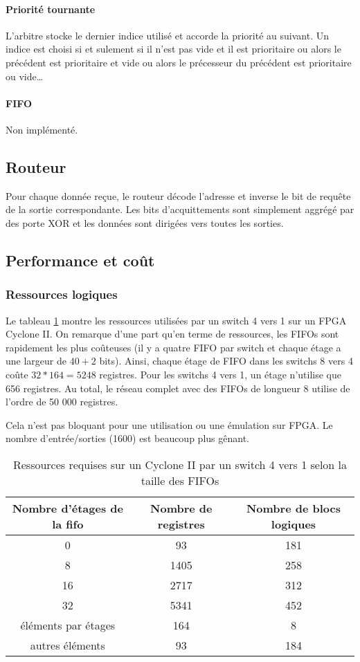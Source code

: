 \documentclass[11pt]{article}
\begin{document}
\paragraph{Priorité tournante}
L'arbitre stocke le dernier indice utilisé et accorde la priorité au suivant. Un indice est choisi si et sulement si il n'est pas vide et il est prioritaire ou alors le précédent est prioritaire et vide ou alors le précesseur du précédent est prioritaire ou vide\ldots
\paragraph{FIFO} Non implémenté.


\subsection{Routeur}

Pour chaque donnée reçue, le routeur décode l'adresse et inverse le bit de requête de la sortie correspondante. Les bits d'acquittements sont simplement aggrégé par des porte XOR et les données sont dirigées vers toutes les sorties.

\subsection{Performance et coût}

\subsubsection{Ressources logiques}
Le tableau \ref{perfs-sw-4} montre les ressources utilisées par un switch 4 vers 1 sur un FPGA Cyclone II. On remarque d'une part qu'en terme de ressources, les FIFOs sont rapidement les plus coûteuses (il y a quatre FIFO par switch et chaque étage a une largeur de $40+2$ bits). Ainsi, chaque étage de FIFO dans les switchs 8 vers 4 coûte $32*164=5248$ registres. Pour les switchs 4 vers 1, un étage n'utilise que 656 registres. Au total, le réseau complet avec des FIFOs de longueur 8 utilise de l'ordre de 50 000 registres.

Cela n'est pas bloquant pour une utilisation ou une émulation sur FPGA. Le nombre d'entrée/sorties (1600) est beaucoup plus gênant.

\begin{table}
\centering
\begin{tabular}{|c|c|c|}
\hline
Nombre d'étages de la fifo & Nombre de registres & Nombre de blocs logiques \\
\hline
0 & 93 & 181 \\
8 & 1405 & 258 \\
16 &  2717 & 312 \\
32 & 5341 & 452 \\
\hline \hline
éléments par étages & 164 & 8 \\
autres éléments & 93 & 184 \\
\hline
\end{tabular}
\caption{Ressources requises sur un Cyclone II par un switch 4 vers 1 selon la taille des FIFOs}
\label{perfs-sw-4}
\end{table}
\end{document}

